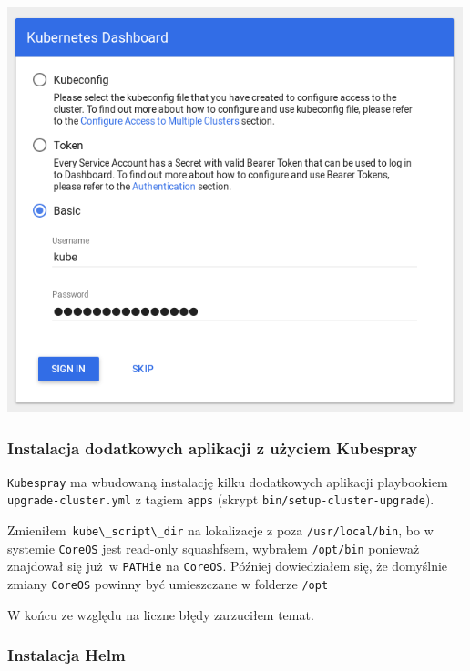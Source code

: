 \documentclass[a4paper,12pt,twoside,openany]{report}
\newcommand{\passthrough}[1]{#1}
\begin{document}
\includegraphics[width=5.20833in,height=4.63542in]{assets/dashboard-login-new.png}\\

\hypertarget{instalacja-dodatkowych-aplikacji-z-uux17cyciem-kubespray}{%
\subsubsection{Instalacja dodatkowych aplikacji z użyciem
Kubespray}\label{instalacja-dodatkowych-aplikacji-z-uux17cyciem-kubespray}}

\passthrough{\lstinline!Kubespray!} ma wbudowaną instalację kilku
dodatkowych aplikacji playbookiem
\passthrough{\lstinline!upgrade-cluster.yml!} z tagiem
\passthrough{\lstinline!apps!} (skrypt
\passthrough{\lstinline!bin/setup-cluster-upgrade!}).

Zmieniłem~\passthrough{\lstinline!kube\_script\_dir!} na lokalizacje z
poza \passthrough{\lstinline!/usr/local/bin!}, bo w systemie
\passthrough{\lstinline!CoreOS!} jest read-only squashfsem, wybrałem
\passthrough{\lstinline!/opt/bin!} ponieważ znajdował się już~w
\passthrough{\lstinline!PATHie!} na \passthrough{\lstinline!CoreOS!}.
Później dowiedziałem się, że domyślnie zmiany
\passthrough{\lstinline!CoreOS!} powinny być umieszczane w folderze
\passthrough{\lstinline!/opt!}

W końcu ze względu na liczne błędy zarzuciłem temat.

\hypertarget{instalacja-helm}{%
\subsubsection{Instalacja Helm}\label{instalacja-helm}}
\end{document}

